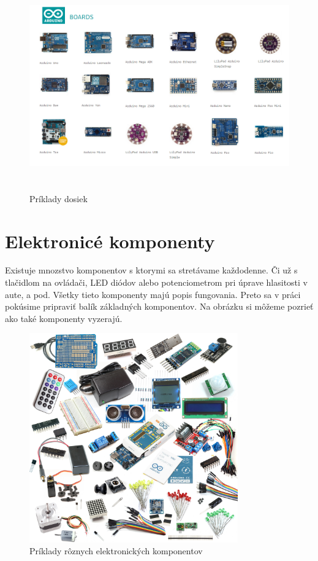 \begin{figure}[H]
	\begin{center}
		\includegraphics[height=9cm]{pics/arduino-boards.png}
		\caption{Príklady dosiek}
	\end{center}
\end{figure}

\chapter{Elektronicé komponenty}

Existuje mnozstvo komponentov s ktorymi sa stretávame každodenne. Či už s tlačidlom na ovládači, LED diódov alebo potenciometrom pri úprave hlasitosti v aute, a pod. Všetky tieto komponenty majú popis fungovania. Preto sa v práci pokúsime pripraviť balík základných komponentov. Na obrázku si môžeme pozrieť ako také komponenty vyzerajú.

\begin{figure}[H]
	\begin{center}
		\includegraphics[height=9cm]{pics/components.png}
		\caption{Príklady rôznych elektronických komponentov}
	\end{center}
\end{figure}


